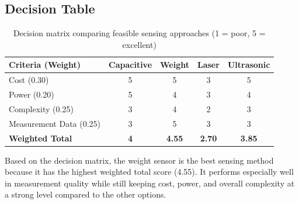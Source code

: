 \subsection{Decision Table}

\begin{table}[h]
\centering
\begin{tabular}{lcccc}
\hline
\textbf{Criteria (Weight)} & \textbf{Capacitive} & \textbf{Weight} & \textbf{Laser} & \textbf{Ultrasonic} \\
\hline
Cost (0.30)             & 5 & 5 & 3 & 5 \\
Power (0.20)            & 5 & 4 & 3 & 4 \\
Complexity (0.25)       & 3 & 4 & 2 & 3 \\
Measurement Data (0.25) & 3 & 5 & 3 & 3 \\
\hline
\textbf{Weighted Total} & \textbf{4} & \textbf{4.55} & \textbf{2.70} & \textbf{3.85} \\
\hline
\end{tabular}
\caption{Decision matrix comparing feasible sensing approaches (1 = poor, 5 = excellent)}
\end{table}

Based on the decision matrix, the weight sensor is the best sensing 
method because it has the highest weighted total score (4.55). It performs especially well 
in measurement quality while still keeping cost, power, and overall complexity at a strong level compared to the other options.
